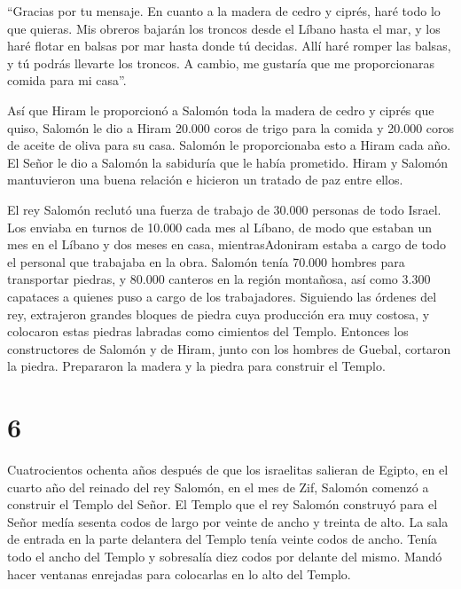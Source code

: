 ``Gracias por tu mensaje. En cuanto a la madera de cedro y ciprés, haré
todo lo que quieras.  Mis obreros bajarán los troncos desde
el Líbano hasta el mar, y los haré flotar en balsas por mar hasta donde
tú decidas. Allí haré romper las balsas, y tú podrás llevarte los
troncos. A cambio, me gustaría que me proporcionaras comida para mi
casa''.

 Así que Hiram le proporcionó a Salomón toda la madera de
cedro y ciprés que quiso,  Salomón le dio a Hiram 20.000
coros de trigo para la comida y 20.000 coros de aceite de oliva para su
casa. Salomón le proporcionaba esto a Hiram cada año.  El
Señor le dio a Salomón la sabiduría que le había prometido. Hiram y
Salomón mantuvieron una buena relación e hicieron un tratado de paz
entre ellos.

 El rey Salomón reclutó una fuerza de trabajo de 30.000
personas de todo Israel.  Los enviaba en turnos de 10.000
cada mes al Líbano, de modo que estaban un mes en el Líbano y dos meses
en casa, mientrasAdoniram estaba a cargo de todo el personal que
trabajaba en la obra.  Salomón tenía 70.000 hombres para
transportar piedras, y 80.000 canteros en la región montañosa,
 así como 3.300 capataces a quienes puso a cargo de los
trabajadores.  Siguiendo las órdenes del rey, extrajeron
grandes bloques de piedra cuya producción era muy costosa, y colocaron
estas piedras labradas como cimientos del Templo.  Entonces
los constructores de Salomón y de Hiram, junto con los hombres de
Guebal, cortaron la piedra. Prepararon la madera y la piedra para
construir el Templo.

\hypertarget{section-5}{%
\section{6}\label{section-5}}

 Cuatrocientos ochenta años después de que los israelitas
salieran de Egipto, en el cuarto año del reinado del rey Salomón, en el
mes de Zif, Salomón comenzó a construir el Templo del Señor.
 El Templo que el rey Salomón construyó para el Señor medía
sesenta codos de largo por veinte de ancho y treinta de alto.
 La sala de entrada en la parte delantera del Templo tenía
veinte codos de ancho. Tenía todo el ancho del Templo y sobresalía diez
codos por delante del mismo.  Mandó hacer ventanas enrejadas
para colocarlas en lo alto del Templo.


